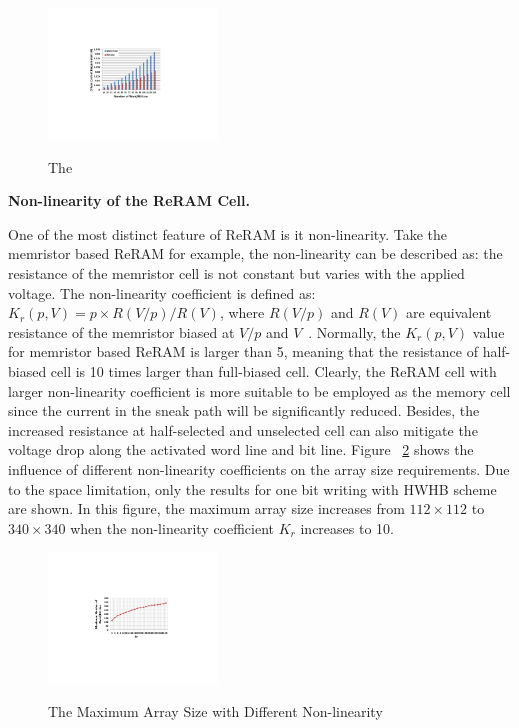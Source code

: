 \begin{figure}%
\centering
  \includegraphics[width=0.4\textwidth]{./figures/multi_I2.pdf}\\
  \caption{The }\label{fig:multi_I}
\end{figure}

\vspace{10pt} \textbf{Non-linearity of the ReRAM Cell.} \vspace{8pt}

One of the most distinct feature of ReRAM is it non-linearity. Take the memristor based ReRAM for example, the non-linearity can be described as: the resistance of the memristor cell is not constant but varies with the applied voltage. The non-linearity coefficient is defined as:
$K_r(p,V) = p \times R(V/p)/R(V)$, where $R(V/p)$ and $R(V)$ are equivalent resistance of the memristor biased at $V/p$ and $V$~\cite{memristor:Cong}. Normally, the $K_r(p,V)$ value for memristor based ReRAM is larger than 5, meaning that the resistance of half-biased  cell is 10 times larger than full-biased cell. Clearly, the ReRAM cell with larger non-linearity coefficient is more suitable to be employed as the memory cell since the current in the sneak path will be significantly reduced. Besides, the increased resistance at half-selected and unselected cell can also mitigate the voltage drop along the activated word line and bit line. Figure ~\ref{fig:non_linear} shows the influence of different non-linearity coefficients on the array size requirements. Due to the space limitation, only the results for one bit writing with HWHB scheme are shown. In this figure, the maximum array size increases from $112 \times 112$ to $340 \times 340$ when the non-linearity coefficient $K_r$ increases to 10.

\begin{figure}%
\centering
  \includegraphics[width=0.4\textwidth]{./figures/non_linear}\\
  \caption{The Maximum Array Size with Different Non-linearity}\label{fig:non_linear}
\end{figure}

